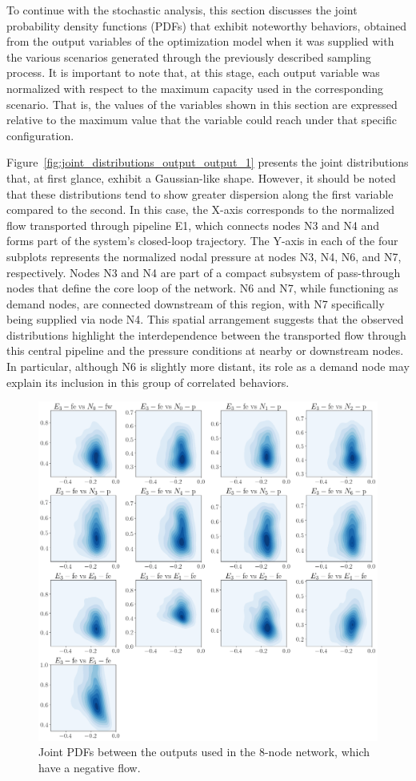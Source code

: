 To continue with the stochastic analysis, this section discusses the joint probability density functions (PDFs) that exhibit noteworthy behaviors, obtained from the output variables of the optimization model when it was supplied with the various scenarios generated through the previously described sampling process. It is important to note that, at this stage, each output variable was normalized with respect to the maximum capacity used in the corresponding scenario. That is, the values of the variables shown in this section are expressed relative to the maximum value that the variable could reach under that specific configuration.


Figure~\ref{fig:joint_distributions_output_output_1} presents the joint distributions that, at first glance, exhibit a Gaussian-like shape. However, it should be noted that these distributions tend to show greater dispersion along the first variable compared to the second. In this case, the X-axis corresponds to the normalized flow transported through pipeline E1, which connects nodes N3 and N4 and forms part of the system’s closed-loop trajectory. The Y-axis in each of the four subplots represents the normalized nodal pressure at nodes N3, N4, N6, and N7, respectively.
Nodes N3 and N4 are part of a compact subsystem of pass-through nodes that define the core loop of the network. N6 and N7, while functioning as demand nodes, are connected downstream of this region, with N7 specifically being supplied via node N4. This spatial arrangement suggests that the observed distributions highlight the interdependence between the transported flow through this central pipeline and the pressure conditions at nearby or downstream nodes. In particular, although N6 is slightly more distant, its role as a demand node may explain its inclusion in this group of correlated behaviors.


\begin{figure}
    \begin{center}
        \includegraphics[width=.7\textwidth]{figures/Chapter_NonLinealCensnet/outputs_outputs_2.png}
    \end{center}
    \caption{Joint PDFs between the outputs used in the 8-node network, which have a negative flow.}
    \label{fig:joint_distributions_output_output_2}
\end{figure}
 
